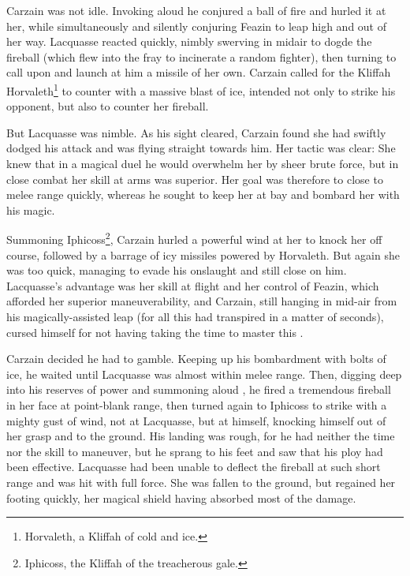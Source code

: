 \documentclass[a4paper,10pt,openany,oneside]{article}
\begin{document}
Carzain was not idle. Invoking aloud  he conjured a ball of fire and hurled it at her, while simultaneously and silently conjuring Feazin to leap high and out of her way. Lacquasse reacted quickly, nimbly swerving in midair to dogde the fireball (which flew into the fray to incinerate a random fighter), then turning to call upon \Izion{} and launch at him a missile of her own. Carzain called for the Kliffah Horvaleth\footnote{Horvaleth, a Kliffah of cold and ice.} to counter with a massive blast of ice, intended not only to strike his opponent, but also to counter her fireball. 

But Lacquasse was nimble. As his sight cleared, Carzain found she had swiftly dodged his attack and was flying straight towards him. Her tactic was clear: She knew that in a magical duel he would overwhelm her by sheer brute force, but in close combat her skill at arms was superior. Her goal was therefore to close to melee range quickly, whereas he sought to keep her at bay and bombard her with his magic. 


Summoning Iphicoss\footnote{Iphicoss, the Kliffah of the treacherous gale.}, Carzain hurled a powerful wind at her to knock her off course, followed by a barrage of icy missiles powered by Horvaleth. But again she was too quick, managing to evade his onslaught and still close on him. Lacquasse's advantage was her skill at flight and her control of Feazin, which afforded her superior maneuverability, and Carzain, still hanging in mid-air from his magically-assisted leap (for all this had transpired in a matter of seconds), cursed himself for not having taking the time to master this \Sephirah{}. 


Carzain decided he had to gamble. Keeping up his bombardment with bolts of ice, he waited until Lacquasse was almost within melee range. Then, digging deep into his reserves of power and summoning aloud \Izion, he fired a tremendous fireball in her face at point-blank range, then turned again to Iphicoss to strike with a mighty gust of wind, not at Lacquasse, but at himself, knocking himself out of her grasp and to the ground. His landing was rough, for he had neither the time nor the skill to maneuver, but he sprang to his feet and saw that his ploy had been effective. Lacquasse had been unable to deflect the fireball at such short range and was hit with full force. She was fallen to the ground, but regained her footing quickly, her magical shield having absorbed most of the damage. 
\end{document}
